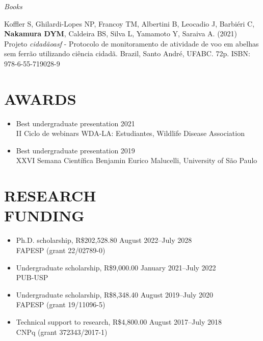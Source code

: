 \documentclass[margin, 10pt]{res} %
\begin{document}
\begin{resume}
{\sl Books}
\begin{etaremune}
\item Koffler S, Ghilardi-Lopes NP, Francoy TM, Albertini B, Leocadio J, Barbiéri C, \textbf{Nakamura DYM}, Caldeira BS, Silva L, Yamamoto Y, Saraiva A. (2021) Projeto \emph{cidadãoasf} - Protocolo de monitoramento de atividade de voo em abelhas sem ferrão utilizando ciência cidadã. Brazil, Santo André, UFABC. 72p. ISBN: 978-6-55-719028-9
\end{etaremune}


\section{AWARDS}
\begin{itemize}
\item Best undergraduate presentation \hfill 2021 \\
II Ciclo de webinars WDA-LA: Estudiantes, Wildlife Disease Association 
\item Best undergraduate presentation \hfill 2019 \\
XXVI Semana Científica Benjamin Eurico Malucelli, University of São Paulo 
\end{itemize}


\section{RESEARCH \\FUNDING}

\begin{itemize}
\item Ph.D. scholarship, R\$202,528.80 \hfill August 2022--July 2028 \\
FAPESP (grant 22/02789-0)
\item Undergraduate scholarship, R\$9,000.00 \hfill January 2021--July 2022 \\
PUB-USP
\item Undergraduate scholarship, R\$8,348.40 \hfill August 2019--July 2020 \\
FAPESP (grant 19/11096-5)
\item Technical support to research, R\$4,800.00 \hfill August 2017--July 2018 \\
CNPq (grant 372343/2017-1)
\end{itemize}


\end{resume}
\end{document}
